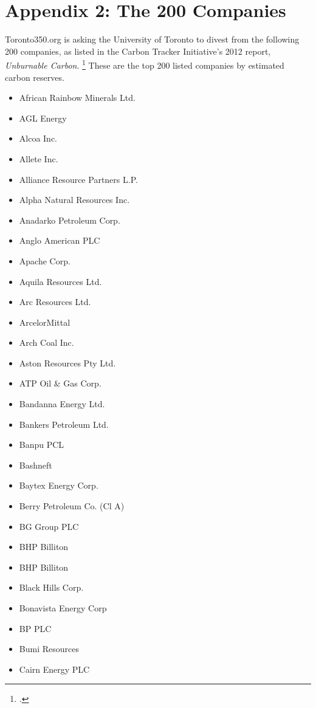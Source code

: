 
\section {Appendix 2: The 200 Companies}

Toronto350.org is asking the University of Toronto to divest from the following 200 companies, as listed in the Carbon Tracker Initiative's 2012 report, \emph{Unburnable Carbon}. \footcite{CTI2012} These are the top 200 listed companies by estimated carbon reserves.

\begin{itemize}
  \item African Rainbow Minerals Ltd.
  \item AGL Energy
  \item Alcoa Inc.
  \item Allete Inc.
  \item Alliance Resource Partners L.P.
  \item Alpha Natural Resources Inc.
  \item Anadarko Petroleum Corp.
  \item Anglo American PLC
  \item Apache Corp.
  \item Aquila Resources Ltd.
  \item Arc Resources Ltd.
  \item ArcelorMittal
  \item Arch Coal Inc.
  \item Aston Resources Pty Ltd.
  \item ATP Oil \& Gas Corp.
  \item Bandanna Energy Ltd.
  \item Bankers Petroleum Ltd.
  \item Banpu PCL
  \item Bashneft
  \item Baytex Energy Corp.
  \item Berry Petroleum Co. (Cl A)
  \item BG Group PLC
  \item BHP Billiton
  \item BHP Billiton
  \item Black Hills Corp.
  \item Bonavista Energy Corp
  \item BP PLC
  \item Bumi Resources
  \item Cairn Energy PLC

\end{itemize}
